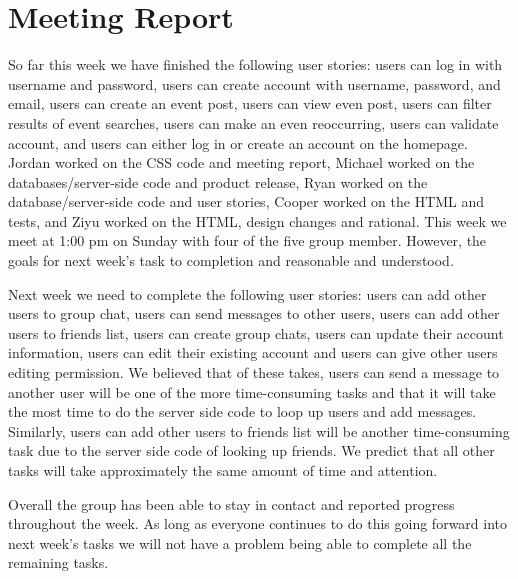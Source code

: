 \documentclass[a4paper]{article}
\begin{document}
\newpage

\section{Meeting Report}
So far this week we have finished the following user stories: users can log in with username and password, users can create account with username, password, and email, users can create an event post, users can view even post, users can filter results of event searches, users can make an even reoccurring, users can validate account, and users can either log in or create an account on the homepage. Jordan worked on the CSS code and meeting report, Michael worked on the databases/server-side code and product release, Ryan worked on the database/server-side code and user stories, Cooper worked on the HTML and tests, and Ziyu worked on the HTML, design changes and rational. This week we meet at 1:00 pm on Sunday with four of the five group member. However, the goals for next week’s task to completion and reasonable and understood. 

Next week we need to complete the following user stories: users can add other users to group chat, users can send messages to other users, users can add other users to friends list, users can create group chats, users can update their account information, users can edit their existing account and users can give other users editing permission. We believed that of these takes, users can send a message to another user will be one of the more time-consuming tasks and that it will take the most time to do the server side code to loop up users and add messages. Similarly, users can add other users to friends list will be another time-consuming task due to the server side code of looking up friends. We predict that all other tasks will take approximately the same amount of time and attention. 

Overall the group has been able to stay in contact and reported progress throughout the week. As long as everyone continues to do this going forward into next week’s tasks we will not have a problem being able to complete all the remaining tasks. 
\end{document}
